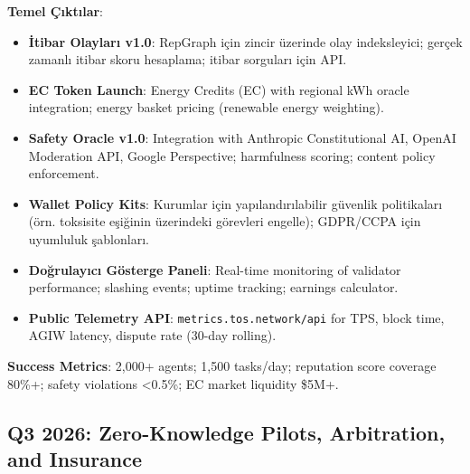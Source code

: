 \documentclass[11pt]{article}
\begin{document}
\begin{itemize}[noitemsep]
\begin{itemize}[noitemsep]
\begin{itemize}[noitemsep]
\begin{itemize}[noitemsep]
\begin{itemize}[noitemsep]
\begin{itemize}[noitemsep]
\begin{itemize}[noitemsep]
\begin{enumerate}[noitemsep]
\begin{itemize}[noitemsep]
\textbf{Temel Çıktılar}:
\begin{itemize}[noitemsep]
  \item \textbf{İtibar Olayları v1.0}: RepGraph için zincir üzerinde olay indeksleyici; gerçek zamanlı itibar skoru hesaplama; itibar sorguları için API.
  \item \textbf{EC Token Launch}: Energy Credits (EC) with regional kWh oracle integration; energy basket pricing (renewable energy weighting).
  \item \textbf{Safety Oracle v1.0}: Integration with Anthropic Constitutional AI, OpenAI Moderation API, Google Perspective; harmfulness scoring; content policy enforcement.
  \item \textbf{Wallet Policy Kits}: Kurumlar için yapılandırılabilir güvenlik politikaları (örn. toksisite eşiğinin üzerindeki görevleri engelle); GDPR/CCPA için uyumluluk şablonları.
  \item \textbf{Doğrulayıcı Gösterge Paneli}: Real-time monitoring of validator performance; slashing events; uptime tracking; earnings calculator.
  \item \textbf{Public Telemetry API}: \texttt{metrics.tos.network/api} for TPS, block time, AGIW latency, dispute rate (30-day rolling).
\end{itemize}

\textbf{Success Metrics}: 2,000+ agents; 1,500 tasks/day; reputation score coverage 80\%+; safety violations <0.5\%; EC market liquidity \$5M+.

\subsection{Q3 2026: Zero-Knowledge Pilots, Arbitration, and Insurance}


\end{itemize}
\end{enumerate}
\end{itemize}
\end{itemize}
\end{itemize}
\end{itemize}
\end{itemize}
\end{itemize}
\end{itemize}
\end{document}
